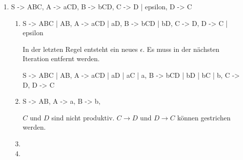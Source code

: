 \documentclass{lehramt-informatik-aufgabe}
\begin{document}
\begin{enumerate}

\item %

\begin{liProduktionsRegeln}
S -> ABC,
A -> aCD,
B -> bCD,
C -> D | epsilon,
D -> C
\end{liProduktionsRegeln}

\begin{liAntwort}
\begin{enumerate}
\item {}

\begin{liProduktionsRegeln}
S -> ABC | AB,
A -> aCD | aD,
B -> bCD | bD,
C -> D,
D -> C | epsilon
\end{liProduktionsRegeln}

In der letzten Regel entsteht ein neues $\epsilon$. Es muss in der
nächsten Iteration entfernt werden.

\begin{liProduktionsRegeln}
S -> ABC | AB,
A -> aCD | aD | aC | a,
B -> bCD | bD | bC | b,
C -> D,
D -> C
\end{liProduktionsRegeln}

\item {}

\begin{liProduktionsRegeln}
S -> AB,
A -> a,
B -> b,
\end{liProduktionsRegeln}

$C$ und $D$ sind nicht produktiv. $C \rightarrow D$ und $D \rightarrow
C$ können gestrichen werden.

\item {}

\liNichtsZuTun

\item {}

\liNichtsZuTun
\end{enumerate}
\end{liAntwort}
\end{enumerate}
\end{document}
